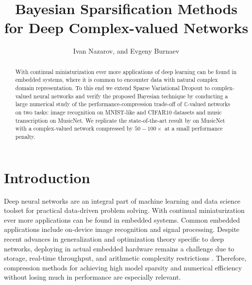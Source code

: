 \documentclass[a4paper,10pt,twocolumn]{article}
\title{Bayesian Sparsification Methods for Deep Complex-valued Networks}
\author{Ivan Nazarov, and Evgeny Burnaev}
\newcommand{\cplx}{\mathbb{C}}
\begin{document}
\maketitle

\begin{abstract}
With continual miniaturization ever more applications of deep learning can be found
in embedded systems, where it is common to encounter data with natural complex domain
representation. To this end we extend Sparse Variational Dropout to complex-valued neural
networks and verify the proposed Bayesian technique by conducting a large numerical
study of the performance-compression trade-off of $\cplx$-valued networks on two tasks:
image recognition on MNIST-like and CIFAR10 datasets and music transcription on MusicNet.
We replicate the state-of-the-art result by \citet{trabelsi_deep_2018} on MusicNet with
a complex-valued network compressed by $50-100\times$ at a small performance penalty.
\end{abstract}

\section{Introduction} %
\label{sec:introduction}

Deep neural networks are an integral part of machine learning and data science toolset
for practical data-driven problem solving. With continual miniaturization ever more
applications can be found in embedded systems. Common embedded applications include
on-device image recognition and signal processing. Despite recent advances in generalization
and optimization theory specific to deep networks, deploying in actual embedded hardware
remains a challenge due to storage, real-time throughput, and arithmetic complexity
restrictions \citep{he_amc:_2018}. Therefore, compression methods for achieving high
model sparsity and numerical efficiency without losing much in performance are especially
relevant.
\end{document}
